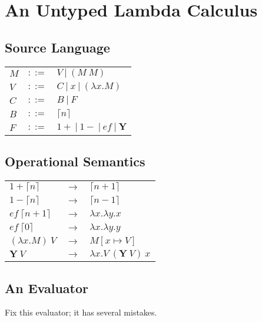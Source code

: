 \documentclass{article}
\newcommand{\Y}[0]{\textbf{Y}}
\begin{document}
\section{An Untyped Lambda Calculus}

\subsection{Source Language}

\begin{tabular}[t]{lll}
$M$ &$::=$& $V\ |\ (M\ M)$\\
$V$ &$::=$& $C\ |\ x\ |\ (\lambda x . M)$\\
$C$ &$::=$& $B\ |\ F$\\
$B$ &$::= $& $\lceil n \rceil$\\
$F$ &$::=$& $1+\ |\ 1-\ |\ ef\ |\ \Y$\\
\end{tabular}

\subsection{Operational Semantics}

\begin{tabular}[t]{lll}
$1+ \lceil n \rceil$ &$\longrightarrow$& $\lceil n + 1 \rceil$\\
$1- \lceil n \rceil$ &$\longrightarrow$& $\lceil n - 1 \rceil$\\
$ef\ \lceil n + 1 \rceil$ &$\longrightarrow$& $\lambda x. \lambda y. x$\\
$ef\ \lceil 0 \rceil$ &$\longrightarrow$& $\lambda x. \lambda y. y$\\
$(\lambda x . M)\ V$ &$\longrightarrow$& $M[x \mapsto V]$\\
$\Y\ V$ &$\longrightarrow$& $\lambda x . V\ (\Y\ V)\ x$\\


\end{tabular}

\subsection{An Evaluator}

Fix this evaluator; it has several mistakes.\\
\end{document}
